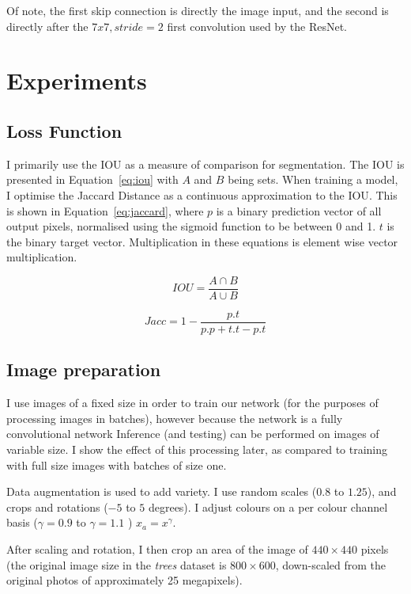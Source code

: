 Of note, the first skip connection is directly the image input, and the second is directly after the $7x7, stride=2$ first convolution used by the ResNet.


\section {Experiments}


\subsection {Loss Function}


I primarily use the \gls{IOU} as a measure of comparison for segmentation. The \gls{IOU} is presented in Equation~\ref{eq:iou} with $ A $ and $ B $ being sets. When training a model, I optimise the Jaccard Distance as a continuous approximation to the \gls{IOU}. This is shown in Equation~\ref{eq:jaccard}, where $ p $ is a binary prediction vector of all output pixels, normalised using the sigmoid function to be between 0 and 1. $ t $ is the binary target vector. Multiplication in these equations is element wise vector multiplication.


\begin{equation}
IOU = \frac{A \cap B}{A \cup B}
\label{eq:iou}
\end{equation}


\begin{equation}
Jacc = 1 - \frac{p.t}{p.p + t.t - p.t}
\label{eq:jaccard}
\end{equation}



\subsection {Image preparation}

I use images of a fixed size in order to train our network (for the purposes of processing images in batches), however because the network is a fully convolutional network Inference (and testing) can be performed on images of variable size. I show the effect of this processing later, as compared to training with full size images with batches of size one.

Data augmentation is used to add variety. I use random scales ($0.8$ to $1.25$), and crops and rotations ($-5$ to $5$ degrees). I adjust colours on a per colour channel basis ($ \gamma = 0.9 $ to $ \gamma=1.1 $ )  $ x_a = x^{\gamma} $.

After scaling and rotation, I then crop an area of the image of $440 \times 440$ pixels (the original image size in the \emph{trees} dataset is $800 \times 600$, down-scaled from the original photos of approximately 25 megapixels).

